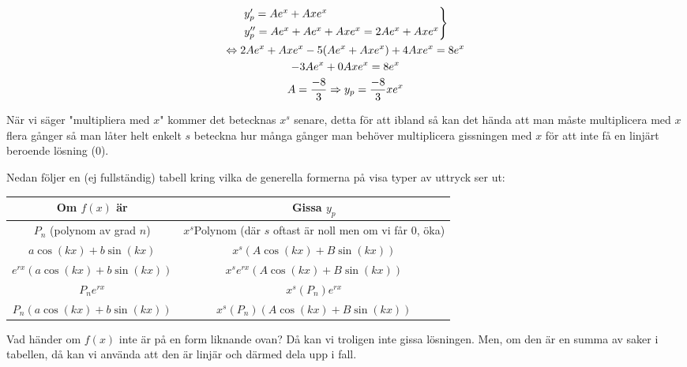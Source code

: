 \begin{equation*}
  \begin{gathered}
    \begin{rcases*}
      y_p^{\prime} = Ae^x+Axe^x\\
      y_p^{\prime\prime}=Ae^x+Ae^x+Axe^x = 2Ae^x+Axe^x
    \end{rcases*}\\
    \Lrarr 2Ae^x+Axe^x-5(Ae^x+Axe^x)+4Axe^x=8e^x\\
    -3Ae^x+0Axe^x=8e^x\\
    A=\dfrac{-8}{3}\Rightarrow y_p=\dfrac{-8}{3}xe^x
  \end{gathered}
\end{equation*}
\par\bigskip

\noindent När vi säger "multipliera med $x$" kommer det betecknas $x^s$ senare, detta för att ibland så kan det hända att man måste multiplicera med $x$ flera gånger så man låter helt enkelt $s$ beteckna hur många gånger man behöver multiplicera gissningen med $x$ för att inte få en linjärt beroende lösning (0).
\par\bigskip
\noindent Nedan följer en (ej fullständig) tabell kring vilka de generella formerna på visa typer av uttryck ser ut:
\par\bigskip
\noindent

\begin{center}
  \begin{tabular}{|c|c|}
    \hline
    \textbf{Om $f(x)$ är}&\textbf{Gissa $y_p$}\\
    \hline
    $P_n$ (polynom av grad $n$)&$x^s$Polynom (där $s$ oftast är noll men om vi får 0, öka)\\
    \hline
    $a\cos(kx)+b\sin(kx)$&$x^s(A\cos(kx)+B\sin(kx))$\\
    \hline
    $e^{rx}(a\cos(kx)+b\sin(kx))$&$x^se^{rx}(A\cos(kx)+B\sin(kx))$\\
    \hline
    $P_ne^{rx}$&$x^s(P_n)e^{rx}$\\
    \hline
    $P_n(a\cos(kx)+b\sin(kx))$&$x^s(P_n)(A\cos(kx)+B\sin(kx))$\\
    \hline
  \end{tabular}
\end{center}
\par\bigskip
\noindent Vad händer om $f(x)$ inte är på en form liknande ovan? Då kan vi troligen inte gissa lösningen. Men, om den är en summa av saker i tabellen, då kan vi använda att den är linjär och därmed dela upp i fall.
\par\bigskip


